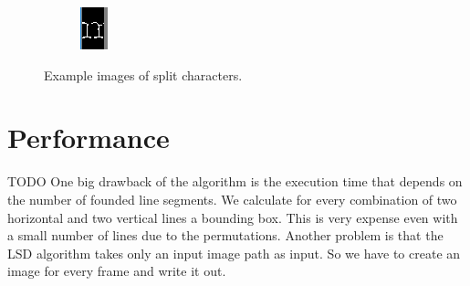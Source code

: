 \documentclass[english, paper=a4]{scrartcl}
\begin{document}
\begin{figure}[b!]
\begin{subfigure}[t!]{0.05\textwidth}
		\label{fig:ex2b}
	\end{subfigure}
	\begin{subfigure}[t!]{0.1\textwidth}
		\includegraphics[width=\textwidth]{splitChars3.png}
		\label{fig:ex2b}
	\end{subfigure}
	\caption{Example images of split characters.}
	\label{fig:ex_proj_vert_char}
\end{figure}

\section{Performance}
TODO
One big drawback of the algorithm is the execution time that depends on the number of founded line segments. We calculate for every combination of two horizontal and two vertical lines a bounding box. This is very expense even with a small number of lines due to the permutations. Another problem is that the LSD algorithm takes only an input image path as input. So we have to create an image for every frame and write it out.
\end{document}
